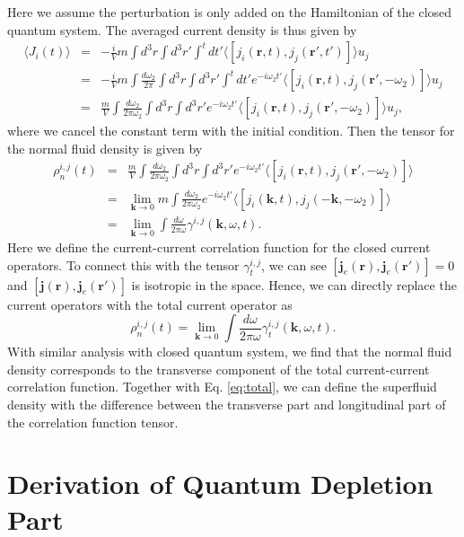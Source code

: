 \documentclass[aps,superscriptaddress,notitlepage,longbibliography]{revtex4-1}
\begin{document}
Here we assume the perturbation is only added on the Hamiltonian of
the closed quantum system. The averaged current density is thus given
by 
\begin{eqnarray}
\langle J_{i}(t)\rangle & = & -\frac{i}{V}m\int d^{3}r\int d^{3}r'\int^{t}dt'\langle[j_{i}(\bm{r},t),j_{j}(\bm{r}',t')]\rangle u_{j}\nonumber \\
 & = & -\frac{i}{V}m\int\frac{d\omega_{2}}{2\pi}\int d^{3}r\int d^{3}r'\int^{t}dt'e^{-i\omega_{2}t'}\langle[j_{i}(\bm{r},t),j_{j}(\bm{r}',-\omega_{2})]\rangle u_{j}\nonumber \\
 & = & \frac{m}{V}\int\frac{d\omega_{2}}{2\pi\omega_{2}}\int d^{3}r\int d^{3}r'e^{-i\omega_{2}t'}\langle[j_{i}(\bm{r},t),j_{j}(\bm{r}',-\omega_{2})]\rangle u_{j},
\end{eqnarray}
where we cancel the constant term with the initial condition. Then
the tensor for the normal fluid density is given by 
\begin{eqnarray}
\rho_{n}^{i,j}(t) & = & \frac{m}{V}\int\frac{d\omega_{2}}{2\pi\omega_{2}}\int d^{3}r\int d^{3}r'e^{-i\omega_{2}t'}\langle[j_{i}(\bm{r},t),j_{j}(\bm{r}',-\omega_{2})]\rangle\nonumber \\
 & = & \lim_{\bm{k}\rightarrow0}m\int\frac{d\omega_{2}}{2\pi\omega_{2}}e^{-i\omega_{2}t'}\langle[j_{i}(\bm{k},t),j_{j}(-\bm{k},-\omega_{2})]\rangle\nonumber \\
 & = & \lim_{\bm{k}\rightarrow0}\int\frac{d\omega}{2\pi\omega}\gamma^{i,j}(\bm{k},\omega,t).
\end{eqnarray}
Here we define the current-current correlation function for the closed
current operators. To connect this with the tensor $\gamma_{t}^{i,j}$,
we can see $[\bm{j}_{e}(\bm{r}),\bm{j}_{e}(\bm{r}')]=0$ and $[\bm{j}(\bm{r}),\bm{j}_{e}(\bm{r}')]$
is isotropic in the space. Hence, we can directly replace the current
operators with the total current operator as 
\begin{equation}
\rho_{n}^{i,j}(t)=\lim_{\bm{k}\rightarrow0}\int\frac{d\omega}{2\pi\omega}\gamma_{t}^{i,j}(\bm{k},\omega,t).
\end{equation}
With similar analysis with closed quantum system, we find that the
normal fluid density corresponds to the transverse component of the
total current-current correlation function. Together with Eq. \eqref{eq:total},
we can define the superfluid density with the difference between the
transverse part and longitudinal part of the correlation function
tensor.

\section{Derivation of Quantum Depletion Part}
\end{document}
